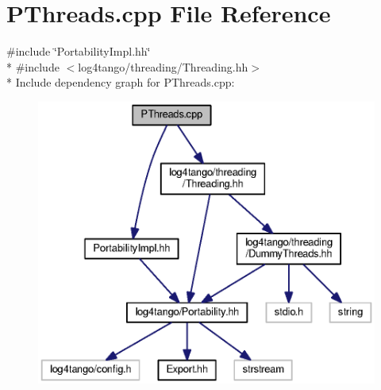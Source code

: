\section{P\-Threads.\-cpp File Reference}
\label{PThreads_8cpp}
{\ttfamily \#include \char`\"{}Portability\-Impl.\-hh\char`\"{}}\\*
{\ttfamily \#include $<$log4tango/threading/\-Threading.\-hh$>$}\\*
Include dependency graph for P\-Threads.\-cpp\-:
\nopagebreak
\begin{figure}[H]
\begin{center}
\leavevmode
\includegraphics[width=350pt]{d5/db6/PThreads_8cpp__incl}
\end{center}
\end{figure}

